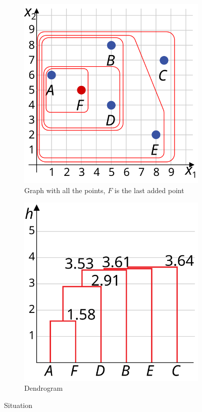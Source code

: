 \documentclass{article}
\begin{document}
\lipsum[1-2]
\begin{figure}[H]
\centering
\begin{subfigure}{.5\linewidth}
\includegraphics[width=\linewidth]{graph-3}
\caption{Graph with all the points, $F$ is the last added point}
\end{subfigure}%
\begin{subfigure}{.5\linewidth}
\includegraphics[width=\linewidth]{dendrogram-3}
\caption{Dendrogram}
\end{subfigure}
\caption{Situation}
\end{figure}
\end{document}
